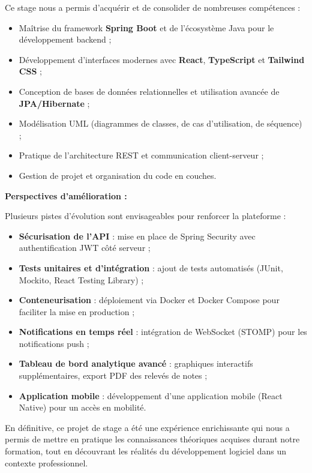 Ce stage nous a permis d'acquérir et de consolider de nombreuses compétences :
\begin{itemize}[noitemsep]
    \item Maîtrise du framework \textbf{Spring Boot} et de l'écosystème Java pour le développement backend ;
    \item Développement d'interfaces modernes avec \textbf{React}, \textbf{TypeScript} et \textbf{Tailwind CSS} ;
    \item Conception de bases de données relationnelles et utilisation avancée de \textbf{JPA/Hibernate} ;
    \item Modélisation UML (diagrammes de classes, de cas d'utilisation, de séquence) ;
    \item Pratique de l'architecture REST et communication client-serveur ;
    \item Gestion de projet et organisation du code en couches.
\end{itemize}

\vspace{0.5cm}

\textbf{Perspectives d'amélioration :}

Plusieurs pistes d'évolution sont envisageables pour renforcer la plateforme :
\begin{itemize}[noitemsep]
    \item \textbf{Sécurisation de l'API} : mise en place de Spring Security avec authentification JWT côté serveur ;
    \item \textbf{Tests unitaires et d'intégration} : ajout de tests automatisés (JUnit, Mockito, React Testing Library) ;
    \item \textbf{Conteneurisation} : déploiement via Docker et Docker Compose pour faciliter la mise en production ;
    \item \textbf{Notifications en temps réel} : intégration de WebSocket (STOMP) pour les notifications push ;
    \item \textbf{Tableau de bord analytique avancé} : graphiques interactifs supplémentaires, export PDF des relevés de notes ;
    \item \textbf{Application mobile} : développement d'une application mobile (React Native) pour un accès en mobilité.
\end{itemize}

\vspace{0.5cm}

En définitive, ce projet de stage a été une expérience enrichissante qui nous a permis de mettre en pratique les connaissances théoriques acquises durant notre formation, tout en découvrant les réalités du développement logiciel dans un contexte professionnel.

\newpage
